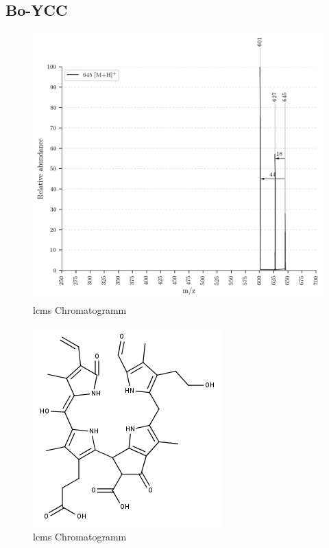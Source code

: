\subsection{Bo-YCC}

\begin{figure}[!htbp]
  \centering
  \includegraphics[width=\textwidth, height=0.7\textwidth]{figures/Kapitel7/Kataboliten/VWA_MS_645-1.png}
  \caption[LC-MS Chromatogramm vor der Reaktion, Quelle: Author]{\gls{lcms} Chromatogramm}
  \label{fig:LCMSChromatogramm}
\end{figure}

\begin{figure}[!htbp]
  \centering
  \includegraphics[scale=0.6]{figures/Kapitel7/Kataboliten/fragmentation_structures/VWA_Katabolit_645_vorReaktion.png}
  \caption[LC-MS Chromatogramm vor der Reaktion, Quelle: Author]{\gls{lcms} Chromatogramm}
  \label{fig:LCMSChromatogramm}
\end{figure}

